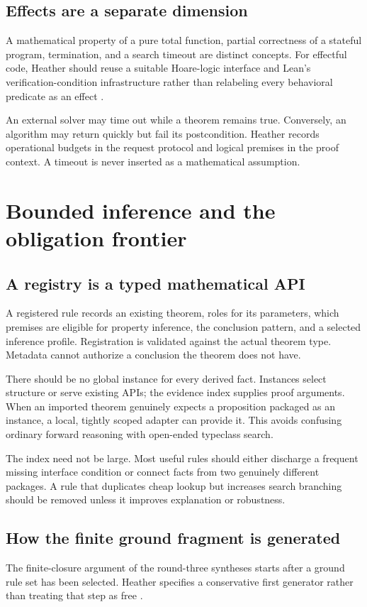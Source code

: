 \documentclass[11pt,letterpaper]{article}
\theoremstyle{definition}\newtheorem{definition}[theorem]{Definition}
\theoremstyle{remark}\newtheorem{remark}[theorem]{Remark}
\begin{document}
\subsection{Effects are a separate dimension}
A mathematical property of a pure total function, partial correctness of a
stateful program, termination, and a search timeout are distinct concepts.
For effectful code, Heather should reuse a suitable Hoare-logic interface and
Lean's verification-condition infrastructure rather than relabeling every
behavioral predicate as an effect \cite{mvcgen}.

An external solver may time out while a theorem remains true. Conversely, an
algorithm may return quickly but fail its postcondition. Heather records
operational budgets in the request protocol and logical premises in the proof
context. A timeout is never inserted as a mathematical assumption.

\section{Bounded inference and the obligation frontier}\label{sec:inference}

\subsection{A registry is a typed mathematical API}
A registered rule records an existing theorem, roles for its parameters,
which premises are eligible for property inference, the conclusion pattern,
and a selected inference profile. Registration is validated against the
actual theorem type. Metadata cannot authorize a conclusion the theorem does
not have.

There should be no global instance for every derived fact. Instances select
structure or serve existing APIs; the evidence index supplies proof arguments.
When an imported theorem genuinely expects a proposition packaged as an
instance, a local, tightly scoped adapter can provide it. This avoids confusing
ordinary forward reasoning with open-ended typeclass search.

The index need not be large. Most useful rules should either discharge a
frequent missing interface condition or connect facts from two genuinely
different packages. A rule that duplicates cheap lookup but increases search
branching should be removed unless it improves explanation or robustness.

\subsection{How the finite ground fragment is generated}
The finite-closure argument of the round-three syntheses starts after a ground
rule set has been selected. Heather specifies a conservative first generator
rather than treating that step as free \cite{round3a,round3b}.
\end{document}
